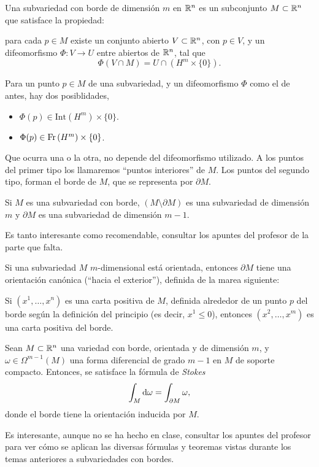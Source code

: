 \begin{defi}
    Una subvariedad con borde de dimensión $m$ en $\mathbb{R}^n$ es un subconjunto $M \subset \mathbb{R}^n$ que satisface
    la propiedad:

    para cada $p \in M$ existe un conjunto abierto $V \subset \mathbb{R}^n$, con $p \in V$, y un difeomorfismo
    $\Phi \colon V \to U$ entre abiertos de $\mathbb{R}^n$, tal que
    \[
        \Phi\left( V \cap M \right) = U \cap \left( H^m \times \{0\}\right).
    \]
\end{defi}

\begin{defi}
    Para un punto $p \in M$ de una subvariedad, y un difeomorfismo $\Phi$ como el de antes, hay dos posiblidades,
    \begin{itemize}
        \item $\Phi(p) \in \text{Int}\left( H^m \right) \times \{0\}$.
        \item $\Phi(p) \in \operatorname{Fr} \left( H^m \right) \times \{0\}$.
    \end{itemize}
    Que ocurra una o la otra, no depende del difeomorfismo utilizado. A los puntos del primer tipo los llamaremos
    ``puntos interiores'' de $M$. Los puntos del segundo tipo, forman el borde de $M$, que se representa por $\partial M$.
\end{defi}

\begin{prop}
    Si $M$ es una subvariedad con borde, $\left( M \setminus \partial M \right)$ es una subvariedad de dimensión $m$ y
    $\partial M$ es una subvariedad de dimensión $m-1$.
\end{prop}

Es tanto interesante como recomendable, consultar los apuntes del profesor de la parte que falta.

\setcounter{lema}{7}

\begin{prop}
    Si una subvariedad $M$ $m$-dimensional está orientada, entonces $\partial M$ tiene una orientación canónica (``hacia el
    exterior''), definida de la marea siguiente:

    Si $\left( x^1, \dots, x^n \right)$ es una carta positiva de $M$, definida alrededor de un punto $p$ del borde según la definición
    del principio (es decir, $x^1 \leq 0$), entonces $\left( x^2, \dots, x^m \right)$ es una carta positiva del borde.
\end{prop}

\begin{teo}
    Sean $M \subset \mathbb{R}^n$ una variedad con borde, orientada y de dimensión $m$, y $\omega \in \Omega^{m-1}(M)$ una forma
    diferencial de grado $m-1$ en $M$ de soporte compacto. Entonces, se satisface la fórmula de \emph{Stokes}
    \[
        \int_M \dif \omega = \int_{\partial M} \omega,
    \]
    donde el borde tiene la orientación inducida por $M$.
\end{teo}

Es interesante, aunque no se ha hecho en clase, consultar los apuntes del profesor para ver cómo se aplican las diversas fórmulas
y teoremas vistas durante los temas anteriores a subvariedades con bordes.
